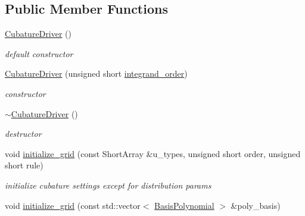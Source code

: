 \subsection*{Public Member Functions}
\begin{DoxyCompactItemize}
\item 
\hyperlink{classPecos_1_1CubatureDriver_a3ec1c82f25587cdc1174b58950c5c2d2}{Cubature\+Driver} ()\label{classPecos_1_1CubatureDriver_a3ec1c82f25587cdc1174b58950c5c2d2}

\begin{DoxyCompactList}\small\item\em default constructor \end{DoxyCompactList}\item 
\hyperlink{classPecos_1_1CubatureDriver_acc9f0bce593907db9cf90297f1959351}{Cubature\+Driver} (unsigned short \hyperlink{classPecos_1_1CubatureDriver_afcf9a1f723bcb50caf73da3bb31362c4}{integrand\+\_\+order})\label{classPecos_1_1CubatureDriver_acc9f0bce593907db9cf90297f1959351}

\begin{DoxyCompactList}\small\item\em constructor \end{DoxyCompactList}\item 
\hyperlink{classPecos_1_1CubatureDriver_a8c303dc560a8d94efb91548ea015ff2e}{$\sim$\+Cubature\+Driver} ()\label{classPecos_1_1CubatureDriver_a8c303dc560a8d94efb91548ea015ff2e}

\begin{DoxyCompactList}\small\item\em destructor \end{DoxyCompactList}\item 
void \hyperlink{classPecos_1_1CubatureDriver_a779bd2b2a1f6d287983396aa7ce65f69}{initialize\+\_\+grid} (const Short\+Array \&u\+\_\+types, unsigned short order, unsigned short rule)\label{classPecos_1_1CubatureDriver_a779bd2b2a1f6d287983396aa7ce65f69}

\begin{DoxyCompactList}\small\item\em initialize cubature settings except for distribution params \end{DoxyCompactList}\item 
void \hyperlink{classPecos_1_1CubatureDriver_a4a1a63a0f30824fcd233da026bdebef6}{initialize\+\_\+grid} (const std\+::vector$<$ \hyperlink{classPecos_1_1BasisPolynomial}{Basis\+Polynomial} $>$ \&poly\+\_\+basis)\label{classPecos_1_1CubatureDriver_a4a1a63a0f30824fcd233da026bdebef6}


\end{DoxyCompactItemize}
